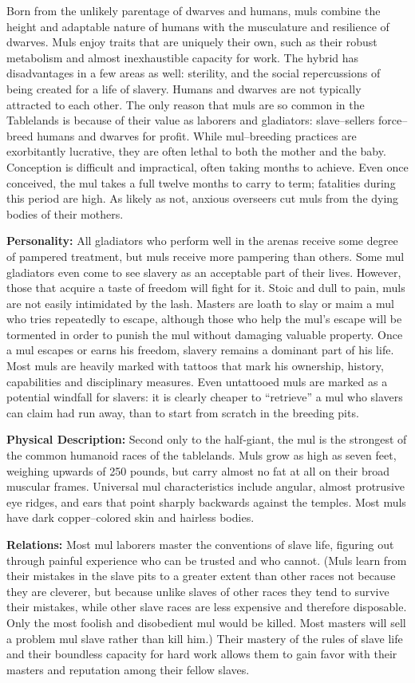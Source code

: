 \documentclass[10pt,a4paper,twocolumn]{d20}
\begin{document}
{Born from the unlikely parentage of dwarves and humans, muls combine the height and adaptable nature of humans with the musculature and resilience of dwarves. Muls enjoy traits that are uniquely their own, such as their robust metabolism and almost inexhaustible capacity for work. The hybrid has disadvantages in a few areas as well: sterility, and the social repercussions of being created for a life of slavery. Humans and dwarves are not typically attracted to each other. The only reason that muls are so common in the Tablelands is because of their value as laborers and gladiators: slave–sellers force–breed humans and dwarves for profit. While mul–breeding practices are exorbitantly lucrative, they are often lethal to both the mother and the baby. Conception is difficult and impractical, often taking months to achieve. Even once conceived, the mul takes a full twelve months to carry to term; fatalities during this period are high. As likely as not, anxious overseers cut muls from the dying bodies of their mothers.

\textbf{Personality:} All gladiators who perform well in the arenas receive some degree of pampered treatment, but muls receive more pampering than others. Some mul gladiators even come to see slavery as an acceptable part of their lives. However, those that acquire a taste of freedom will fight for it. Stoic and dull to pain, muls are not easily intimidated by the lash. Masters are loath to slay or maim a mul who tries repeatedly to escape, although those who help the mul’s escape will be tormented in order to punish the mul without damaging valuable property. Once a mul escapes or earns his freedom, slavery remains a dominant part of his life. Most muls are heavily marked with tattoos that mark his ownership, history, capabilities and disciplinary measures. Even untattooed muls are marked as a potential windfall for slavers: it is clearly cheaper to ``retrieve'' a mul who slavers can claim had run away, than to start from scratch in the breeding pits.

\textbf{Physical Description:} Second only to the half‐giant, the mul is the strongest of the common humanoid races of the tablelands. Muls grow as high as seven feet, weighing upwards of 250 pounds, but carry almost no fat at all on their broad muscular frames. Universal mul characteristics include angular, almost protrusive eye ridges, and ears that point sharply backwards against the temples. Most muls have dark copper–colored skin and hairless bodies.

\textbf{Relations:} Most mul laborers master the conventions of slave life, figuring out through painful experience who can be trusted and who cannot. (Muls learn from their mistakes in the slave pits to a greater extent than other races not because they are cleverer, but because unlike slaves of other races they tend to survive their mistakes, while other slave races are less expensive and therefore disposable. Only the most foolish and disobedient mul would be killed. Most masters will sell a problem mul slave rather than kill him.) Their mastery of the rules of slave life and their boundless capacity for hard work allows them to gain favor with their masters and reputation among their fellow slaves.

}
\end{document}
